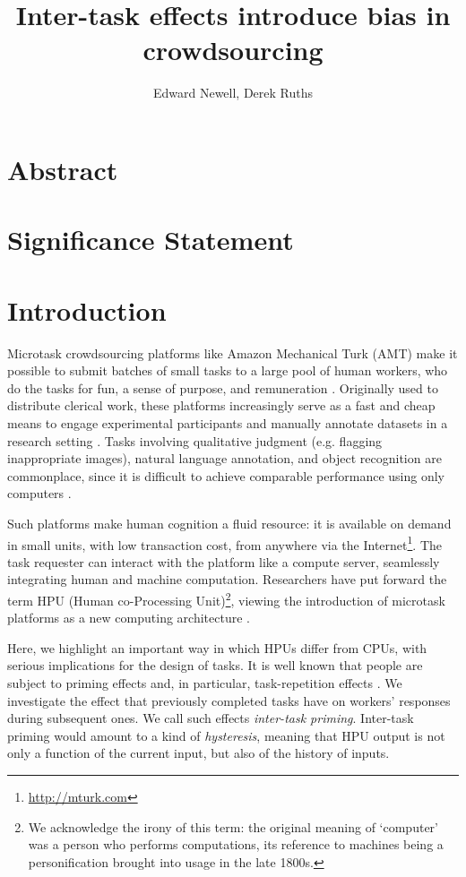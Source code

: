 \documentclass[a4paper]{report}
\title{Inter-task effects introduce bias in crowdsourcing}
\author{Edward Newell, Derek Ruths}
\begin{document}
\maketitle
\section*{Abstract}
\section*{Significance Statement}
\section*{Introduction}

Microtask crowdsourcing platforms like Amazon Mechanical Turk (AMT) make it 
possible to submit batches of small tasks to a large pool of human workers, 
who do the tasks for fun, a sense of purpose, and remuneration 
\cite{kazai2013analysis, Antin20122925}.  
Originally used to distribute clerical work, these platforms 
increasingly serve as a fast and cheap means to engage experimental 
participants and manually annotate datasets in a research 
setting \cite{snow2008cheap}.  
Tasks involving qualitative
judgment (e.g. flagging inappropriate images), natural language annotation,
and object recognition are commonplace, since it is difficult to achieve 
comparable performance using only computers \cite{yuen2011survey}.

Such platforms make human cognition a fluid resource: it is available 
on demand in small units, with low transaction 
cost, from anywhere via the 
Internet\footnote{\href{http://mturk.com}{http://mturk.com}}.
The task requester can 
interact with the platform like a compute server, seamlessly 
integrating human and machine computation.  Researchers have put forward the 
term HPU (Human co-Processing Unit)\footnote{We acknowledge the irony of this 
term: the original meaning of `computer' was a person who performs 
computations, its reference to machines being a personification brought into 
usage in the late 1800s\cite{Dictionary:hl}.}, viewing the introduction of 
microtask platforms as a new computing architecture
\cite{5543192}.  

Here, we highlight an important way in which HPUs differ from CPUs, with 
serious implications for the design of tasks.  It is well known that people 
are subject to priming effects 
\cite{BJOP:BJOP1796, No2007, beller1971priming} and, in particular, task-repetition effects
\cite{Gass1999549, sohn2001task}.  
We investigate the effect that previously completed tasks have on workers'
responses during subsequent ones. We call such effects 
\textit{inter-task priming}.  Inter-task priming would amount to a kind of
\textit{hysteresis}, meaning that HPU output is not only a function of the 
current input, but also of the history of inputs.
\end{document}
